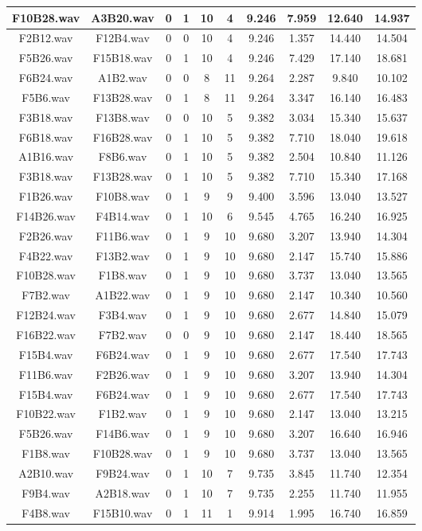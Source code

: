 \documentclass[11pt,a4paper,twoside]{book}
\begin{document}
\begin{longtable}[c]{|c|c|c|c|c|c|c|c|c|c|}
F10B28.wav&A3B20.wav&0&1&10&4&9.246&7.959&12.640&14.937\\ \hline
F2B12.wav&F12B4.wav&0&0&10&4&9.246&1.357&14.440&14.504\\ \hline
F5B26.wav&F15B18.wav&0&1&10&4&9.246&7.429&17.140&18.681\\ \hline
F6B24.wav&A1B2.wav&0&0&8&11&9.264&2.287&9.840&10.102\\ \hline
F5B6.wav&F13B28.wav&0&1&8&11&9.264&3.347&16.140&16.483\\ \hline
F3B18.wav&F13B8.wav&0&0&10&5&9.382&3.034&15.340&15.637\\ \hline
F6B18.wav&F16B28.wav&0&1&10&5&9.382&7.710&18.040&19.618\\ \hline
A1B16.wav&F8B6.wav&0&1&10&5&9.382&2.504&10.840&11.126\\ \hline
F3B18.wav&F13B28.wav&0&1&10&5&9.382&7.710&15.340&17.168\\ \hline
F1B26.wav&F10B8.wav&0&1&9&9&9.400&3.596&13.040&13.527\\ \hline
F14B26.wav&F4B14.wav&0&1&10&6&9.545&4.765&16.240&16.925\\ \hline
F2B26.wav&F11B6.wav&0&1&9&10&9.680&3.207&13.940&14.304\\ \hline
F4B22.wav&F13B2.wav&0&1&9&10&9.680&2.147&15.740&15.886\\ \hline
F10B28.wav&F1B8.wav&0&1&9&10&9.680&3.737&13.040&13.565\\ \hline
F7B2.wav&A1B22.wav&0&1&9&10&9.680&2.147&10.340&10.560\\ \hline
F12B24.wav&F3B4.wav&0&1&9&10&9.680&2.677&14.840&15.079\\ \hline
F16B22.wav&F7B2.wav&0&0&9&10&9.680&2.147&18.440&18.565\\ \hline
F15B4.wav&F6B24.wav&0&1&9&10&9.680&2.677&17.540&17.743\\ \hline
F11B6.wav&F2B26.wav&0&1&9&10&9.680&3.207&13.940&14.304\\ \hline
F15B4.wav&F6B24.wav&0&1&9&10&9.680&2.677&17.540&17.743\\ \hline
F10B22.wav&F1B2.wav&0&1&9&10&9.680&2.147&13.040&13.215\\ \hline
F5B26.wav&F14B6.wav&0&1&9&10&9.680&3.207&16.640&16.946\\ \hline
F1B8.wav&F10B28.wav&0&1&9&10&9.680&3.737&13.040&13.565\\ \hline
A2B10.wav&F9B24.wav&0&1&10&7&9.735&3.845&11.740&12.354\\ \hline
F9B4.wav&A2B18.wav&0&1&10&7&9.735&2.255&11.740&11.955\\ \hline
F4B8.wav&F15B10.wav&0&1&11&1&9.914&1.995&16.740&16.859\\ \hline

\end{longtable}
\end{document}
